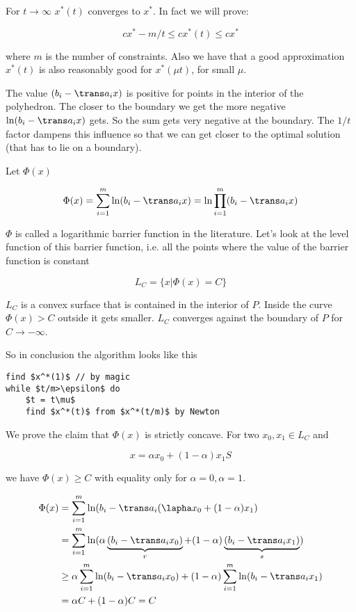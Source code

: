 For $t\rightarrow \infty$ $x^*(t)$ converges to $x^*$. In fact we will prove:

\[cx^* -m/t \leq cx^*(t) \leq cx^*\]

where $m$ is the number of constraints. Also we have that a good approximation $x^*(t)$ is also reasonably good for $x^*(\mu t)$, for small $\mu$.

The value $(b_i-\trans a_i x)$ is positive for points in the interior of the polyhedron. The closer to the boundary we get the more negative $\ln (b_i-\trans a_i x)$ gets. So the sum gets very negative at the boundary. The $1/t$ factor dampens this influence so that we can get closer to the optimal solution (that has to lie on a boundary).

Let $\Phi(x)$

\[\Phi(x) = \sum_{i=1}^m \ln (b_i-\trans a_ix) = \ln \prod_{i=1}^m (b_i-\trans a_i x)\]

$\Phi$ is called a logarithmic barrier function in the literature. Let's look at the level function of this barrier function, i.e. all the points where the value of the barrier function is constant

\[L_C=\{x|\Phi(x)=C\}\]


$L_C$ is a convex surface that is contained in the interior of $P$. Inside the curve $\Phi(x)>C$ outside it gets smaller. $L_C$ converges against the boundary of $P$ for $C\rightarrow -\infty$. %

So in conclusion the algorithm looks like this

\begin{lstlisting}
find $x^*(1)$ // by magic
while $t/m>\epsilon$ do
	$t = t\mu$
	find $x^*(t)$ from $x^*(t/m)$ by Newton
\end{lstlisting}

We prove the claim that $\Phi(x)$ is strictly concave. For two $x_0,x_1\in L_C$ and

\[x=\alpha x_0+(1-\alpha)x_1S\]

we have $\Phi(x)\geq C$ with equality only for $\alpha=0, \alpha=1$.

\begin{align*}
\Phi(x) &= \sum_{i=1}^m\ln (b_i - \trans a_i (\lapha x_0+(1-\alpha)x_1)\\
	&= \sum_{i=1}^m\ln (\alpha\underbrace{(b_i-\trans a_i x_0)}_r +(1-\alpha) \underbrace{(b_i-\trans a_i x_1)}_s)\\
	&\geq \alpha \sum_{i=1}^m \ln (b_i-\trans a_i x_0) + (1-\alpha)\sum_{i=1}^m \ln (b_i-\trans a_i x_1)\\
	&=\alpha C +(1-\alpha)C = C
\end{align*}

